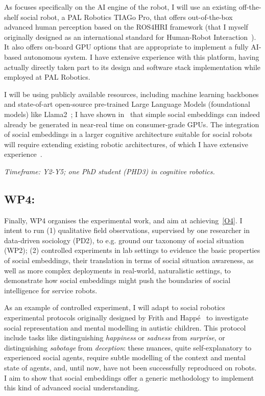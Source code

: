 As \project focuses specifically on the AI engine of the robot, I will use an
existing off-the-shelf social robot, a PAL Robotics TIAGo Pro, that offers
out-of-the-box advanced human perception based on the ROS4HRI framework (that I
myself originally designed as an international standard for Human-Robot
Interaction~\cite{lemaignan2022ros}). It also offers on-board GPU options that
are appropriate to implement a fully AI-based autonomous system. I have
extensive experience with this platform, having actually directly taken part to
its design and software stack implementation while employed at PAL Robotics.

I will be using publicly available resources, including machine
learning backbones and state-of-art open-source
pre-trained Large Language Models (foundational models) like
Llama2~\cite{touvron2023llama}; I have shown in~\cite{lemaignan2024social} that
simple social embeddings can indeed already be generated in near-real time on
consumer-grade GPUs. The integration of social embeddings in a larger cognitive
architecture suitable for social robots will require extending existing
robotic architectures, of which I have extensive
experience~\cite{lemaignan2017artificial, lemaignan2015pyrobots,lemaignan2011what}.

\vspace{1em}
\noindent\emph{Timeframe: Y2-Y5; one PhD student (PHD3) in cognitive robotics.}

\subsection{WP4: \textbf{\WPD}}

Finally, WP4 organises the experimental work, and aim at achieving~\ref{O4}. I
intent to run (1) qualitative field observations, supervised by one researcher
in data-driven sociology (PD2), to e.g. ground our taxonomy of social situation
(WP2); (2) controlled experiments in lab
settings to evidence the basic properties of social embeddings, their
translation in terms of social situation awareness, as well as more complex
deployments in real-world, naturalistic settings, to demonstrate how social
embeddings might push the boundaries of social intelligence for service robots.

As an example of controlled experiment, I will adapt to social
robotics~\cite{lemaignan2015mutual} experimental protocols originally designed
by Frith and Happé~\cite{frith1994autism} to investigate social representation
and mental modelling in autistic children. This protocol include tasks like
distinguishing \emph{happiness} or \emph{sadness} from \emph{surprise}, or
distinguishing \emph{sabotage} from \emph{deception}: these nuances, quite
self-explanatory to experienced social agents, require subtle modelling of the
context and mental state of agents, and, until now, have not been successfully
reproduced on robots. I aim to show that social embeddings offer a generic
methodology to implement this kind of advanced social understanding.

